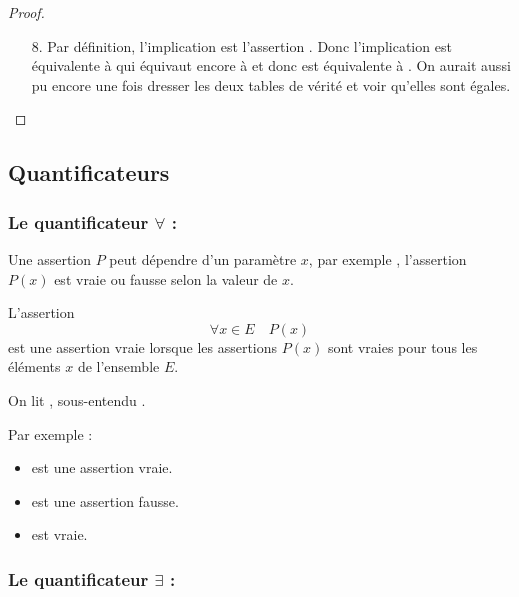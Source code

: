 \documentclass[11pt,class=report,crop=false]{standalone}
\begin{document}
\begin{proof}
\begin{itemize}
  \item[8.] Par définition, l'implication   est l'assertion
.
Donc l'implication
  est équivalente à
qui équivaut encore à
  et donc est équivalente à .
On aurait aussi pu encore une fois dresser les deux tables de vérité et voir qu'elles sont égales.
\end{itemize}
\end{proof}


\subsection{Quantificateurs}

\subsubsection*{Le quantificateur $\forall$ : }
\index{$\forall$}

Une assertion $P$ peut dépendre d'un paramètre $x$, par exemple
 , l'assertion $P(x)$ est vraie ou fausse selon la valeur de $x$.

L'assertion
$$\forall x \in E \quad P(x)$$
est une assertion vraie lorsque les assertions $P(x)$ sont vraies pour tous les éléments $x$
de l'ensemble $E$.

On lit , sous-entendu
.

Par exemple :
\begin{itemize}
  \item \assertion{$\forall x \in [1,+\infty[ \quad (x^2\ge 1)$}  est une assertion vraie.
  \item {}  est une assertion fausse.
  \item {}  est vraie.
\end{itemize}


\subsubsection*{Le quantificateur $\exists$ : }
\index{$\exists$}
\end{document}
